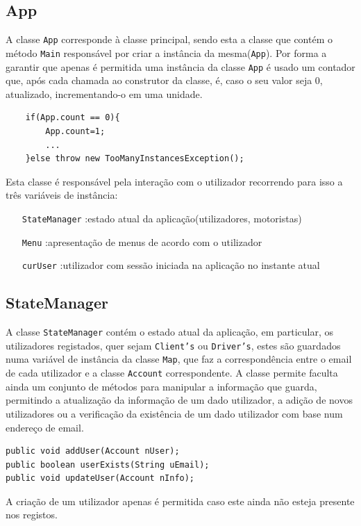 \documentclass[a4paper,10pt,portuguese]{article}
\begin{document}
\subsection{App}
A classe \texttt{App} corresponde à classe principal, sendo esta a classe que contém o método \texttt{Main} responsável por criar a instância da mesma(\texttt{App}).
Por forma a garantir que apenas é permitida uma instância da classe \texttt{App} é usado um contador que, após cada chamada ao construtor da classe, é, caso o seu valor seja 0, atualizado, incrementando-o em uma unidade. 
\begin{verbatim}
	if(App.count == 0){ 
        App.count=1;
        ...
    }else throw new TooManyInstancesException();
\end{verbatim}

Esta classe é responsável pela interação com o utilizador recorrendo para isso a três variáveis de instância: 
\begin{itemize}
\item[\texttt{StateManager}] :estado atual da aplicação(utilizadores, motoristas)
\item[\texttt{Menu}] :apresentação de menus de acordo com o utilizador
\item[\texttt{curUser}] :utilizador com sessão iniciada na aplicação no instante atual 
\end{itemize}

\subsection{StateManager}
A classe \texttt{StateManager} contém o estado atual da aplicação, em particular, os utilizadores registados, quer sejam \texttt{Client's} ou \texttt{Driver's}, estes são guardados numa variável de instância da classe \texttt{Map}, que faz a correspondência entre o email de cada utilizador e a classe \texttt{Account} correspondente.
A classe permite faculta ainda um conjunto de métodos para manipular a informação que guarda, permitindo a atualização da informação de um dado utilizador, a adição de novos utilizadores ou a verificação da existência de um dado utilizador com base num endereço de email.
\begin{verbatim}
public void addUser(Account nUser);
public boolean userExists(String uEmail);
public void updateUser(Account nInfo); 
\end{verbatim}
A criação de um utilizador apenas é permitida caso este ainda não esteja presente nos registos.
\end{document}

